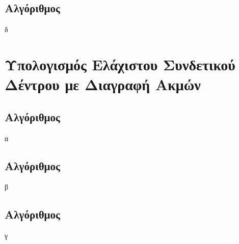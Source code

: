 \documentclass[a4paper,10pt]{article}
\begin{document}
\subsection{Αλγόριθμος}
δ


\section{Υπολογισμός Ελάχιστου Συνδετικού Δέντρου με Διαγραφή Ακμών}
\subsection{Αλγόριθμος}
α
\subsection{Αλγόριθμος}
β
\subsection{Αλγόριθμος}
γ

\end{document}
